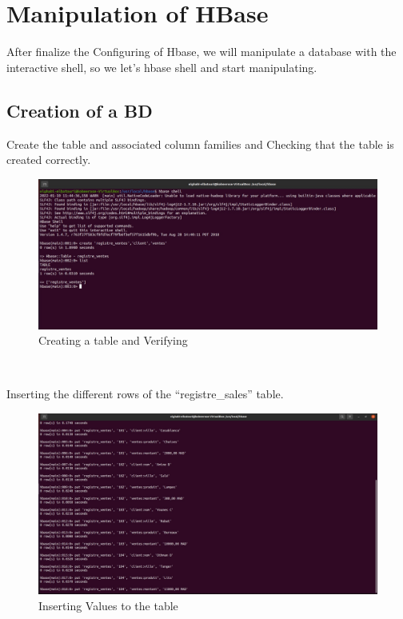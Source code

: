 \chapter{Manipulation of HBase}
\par After finalize the Configuring of Hbase, we will manipulate a database with the interactive shell, so we let's hbase shell and start manipulating.
\\
\begin{spacing}{1.2}
\section{Creation of a BD }
\par Create the table and associated column families and Checking that the table is created correctly.
\\
\begin{figure}[!htb] 
\begin{center} 
\includegraphics[width=1\linewidth]{Pictures/HBase/Manipulation of HBase/Creation of a BD/Creating a table and Verifying .jpg} 
\end{center} 
\caption{Creating a table and Verifying } 
\end{figure}  \FloatBarrier
\\
\newpage

\par Inserting the different rows of the “registre\_sales” table.
\\
\begin{figure}[!htb] 
\begin{center} 
\includegraphics[width=1\linewidth]{Pictures/HBase/Manipulation of HBase/Creation of a BD/Inserting Values to the table} 
\end{center} 
\caption{Inserting Values to the table} 
\end{figure}  \FloatBarrier
\\


\end{spacing}
